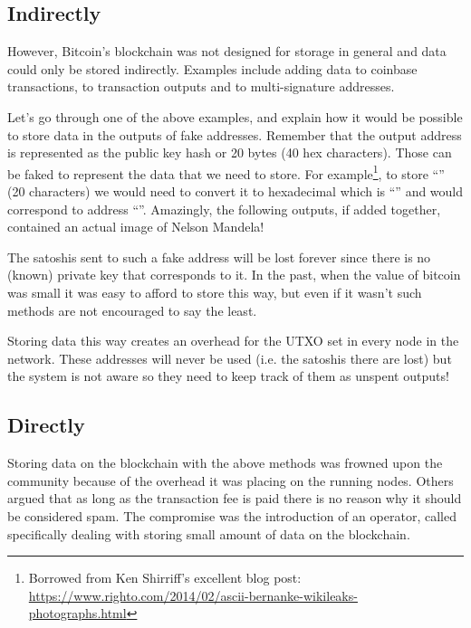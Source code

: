 \subsection*{Indirectly}
However, Bitcoin’s blockchain was not designed for storage in general and data could only be stored indirectly. Examples include adding data to coinbase transactions, to transaction outputs and to multi-signature addresses.

Let's go through one of the above examples, and explain how it would be possible to store data in the outputs of fake addresses. Remember that the output address is represented as the public key hash or 20 bytes (40 hex characters). Those can be faked to represent the data that we need to store. For example\footnote{Borrowed from Ken Shirriff's excellent blog post: \url{https://www.righto.com/2014/02/ascii-bernanke-wikileaks-photographs.html}}, to store ``'' (20 characters) we would need to convert it to hexadecimal which is ``'' and would correspond to address ``''. Amazingly, the following outputs, if added together,  contained an actual image of Nelson Mandela!

The satoshis sent to such a fake address will be lost forever since there is no (known) private key that corresponds to it. In the past, when the value of bitcoin was small it was easy to afford to store this way, but even if it wasn't such methods are not encouraged to say the least.

\begin{note}
Storing data this way creates an overhead for the UTXO set in every node in the network. These addresses will never be used (i.e. the satoshis there are lost) but the system is not aware so they need to keep track of them as unspent outputs!
\end{note}


\subsection*{Directly}
Storing data on the blockchain with the above methods was frowned upon the community because of the overhead it was placing on the running nodes. Others argued that as long as the transaction fee is paid there is no reason why it should be considered spam. The compromise was the introduction of an operator, called  specifically dealing with storing small amount of data on the blockchain.


